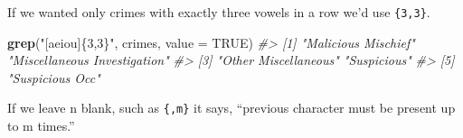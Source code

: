 \documentclass[
  12pt,
]{book}
\newenvironment{Shaded}{\begin{snugshade}}{\end{snugshade}}
\newcommand{\CommentTok}[1]{\textcolor[rgb]{0.37,0.37,0.37}{\textit{#1}}}
\newcommand{\DataTypeTok}[1]{\textcolor[rgb]{0.27,0.27,0.27}{#1}}
\newcommand{\KeywordTok}[1]{\textcolor[rgb]{0.27,0.27,0.27}{\textbf{#1}}}
\newcommand{\NormalTok}[1]{#1}
\newcommand{\OtherTok}[1]{\textcolor[rgb]{0.37,0.37,0.37}{#1}}
\newcommand{\StringTok}[1]{\textcolor[rgb]{0.5,0.5,0.5}{#1}}
\begin{document}
If we wanted only crimes with exactly three vowels in a row we'd use \texttt{\{3,3\}}.

\begin{Shaded}
\begin{Highlighting}[]
\KeywordTok{grep}\NormalTok{(}\StringTok{"[aeiou]\{3,3\}"}\NormalTok{, crimes, }\DataTypeTok{value =} \OtherTok{TRUE}\NormalTok{)}
\CommentTok{\#\textgreater{} [1] "Malicious Mischief"          "Miscellaneous Investigation"}
\CommentTok{\#\textgreater{} [3] "Other Miscellaneous"         "Suspicious"                 }
\CommentTok{\#\textgreater{} [5] "Suspicious Occ"}
\end{Highlighting}
\end{Shaded}

If we leave n blank, such as \texttt{\{,m\}} it says, ``previous character must be present up to m times.''
\end{document}
